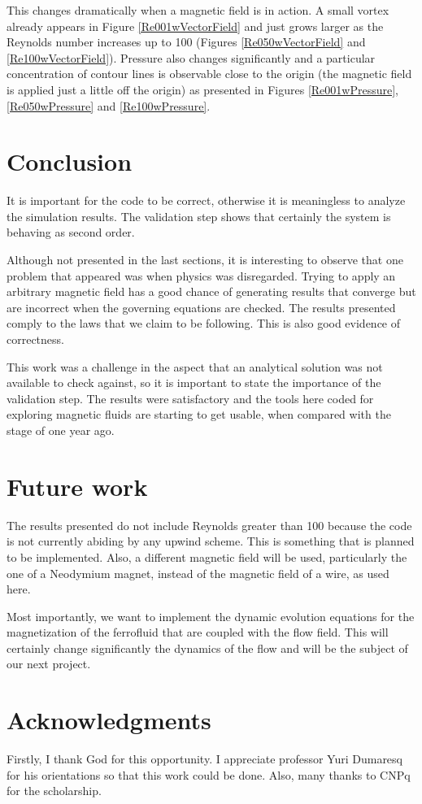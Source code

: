 \documentclass[journal]{IEEEtran}
\begin{document}
This changes dramatically when a magnetic field is in action. A small vortex already appears in Figure \ref{Re001wVectorField} and just grows larger as the Reynolds number increases up to 100 (Figures \ref{Re050wVectorField} and \ref{Re100wVectorField}). Pressure also changes significantly and a particular concentration of contour lines is observable close to the origin (the magnetic field is applied just a little off the origin) as presented in Figures \ref{Re001wPressure}, \ref{Re050wPressure} and \ref{Re100wPressure}.


\section{Conclusion}

It is important for the code to be correct, otherwise it is meaningless to analyze the simulation results. The validation step shows that certainly the system is behaving as second order. 

Although not presented in the last sections, it is interesting to observe that one problem that appeared was when physics was disregarded. Trying to apply an arbitrary magnetic field has a good chance of generating results that converge but are incorrect when the governing equations are checked. The results presented comply to the laws that we claim to be following. This is also good evidence of correctness.

This work was a challenge in the aspect that an analytical solution was not available to check against, so it is important to state the importance of the validation step. The results were satisfactory and the tools here coded for exploring magnetic fluids are starting to get usable, when compared with the stage of one year ago.


\section{Future work}
The results presented do not include Reynolds greater than 100 because the code is not currently abiding by any upwind scheme. This is something that is planned to be implemented. Also, a different magnetic field will be used, particularly the one of a Neodymium magnet, instead of the magnetic field of a wire, as used here.

Most importantly, we want to implement the dynamic evolution equations for the magnetization of the ferrofluid that are coupled with the flow field. This will certainly change significantly the dynamics of the flow and will be the subject of our next project.




\section*{Acknowledgments}

Firstly, I thank God for this opportunity. I appreciate professor Yuri Dumaresq for his orientations so that this work could be done. Also, many thanks to CNPq for the scholarship.




\end{document}
